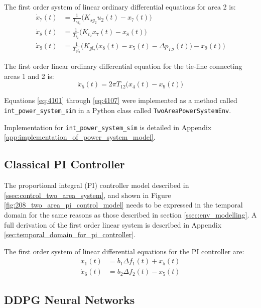 The first order system of linear ordinary differential equations for area 2 is:
\begin{align}
	\dot{x}_7(t) &= \frac{1}{T_{sg_2}}\big( K_{sg_2} u_2(t) - x_7(t) \big) \label{eq:4104} \\
	\dot{x}_8(t) &= \frac{1}{T_{t_2}} \big( K_{t_2} x_7(t) - x_8(t) \label{eq:4105} \big)\\
	\dot{x}_9(t) &= \frac{1}{T_{gl_2}} \bigg( K_{gl_2} \big( x_8(t) - x_5(t) - \Delta p_{L2}(t) \big) - x_9(t) \label{eq:4106} \bigg)
\end{align}

The first order linear ordinary differential equation for the tie-line connecting areas 1 and 2 is:
\begin{equation}
	\dot{x}_5(t) = 2 \pi T_{12} \big( x_4(t) - x_9(t) \big) \label{eq:4107}
\end{equation}

Equations \ref{eq:4101} through \ref{eq:4107} were implemented as a method called \verb|int_power_system_sim| in a Python class called \verb|TwoAreaPowerSystemEnv|.

Implementation for \verb|int_power_system_sim| is detailed in Appendix \ref{app:implementation_of_power_system_model}.


\subsection{Classical PI Controller}
The proportional integral (PI) controller model described in \textsection \ref{ssec:control_two_area_system}, and shown in Figure \ref{fig:208_two_area_pi_control_model} needs to be expressed in the temporal domain for the same reasons as those described in section \ref{ssec:env_modelling}. A full derivation of the first order linear system is described in Appendix \ref{sec:temporal_domain_for_pi_controller}.

The first order system of linear differential equations for the PI controller are:
\begin{align}
	\dot{x}_1(t) &= b_1 \Delta f_1(t) + x_5(t) \\
	\dot{x}_6(t) &= b_2 \Delta f_2(t) - x_5(t)
\end{align}



\subsection{DDPG Neural Networks}

